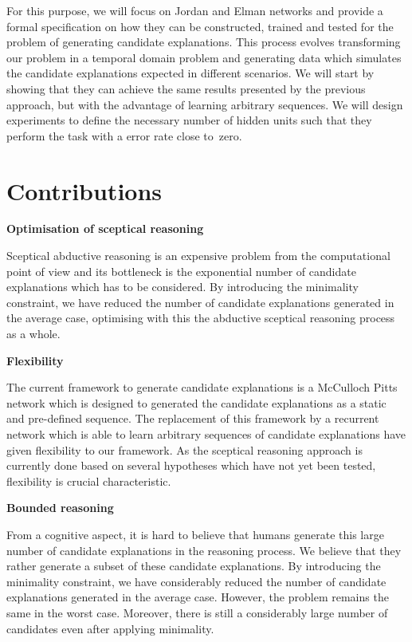 For this purpose, we will focus on Jordan and Elman networks and provide a formal specification on how they can be constructed, trained and tested for the problem of generating candidate explanations. This process evolves transforming our problem in a temporal domain problem and generating data which simulates the candidate explanations expected in different scenarios. We will start by showing that they can achieve the same results presented by the previous approach, but with the advantage of learning arbitrary sequences. We will design experiments to define the necessary number of hidden units such that they perform the task with a error rate close to~zero.

\section{Contributions}

\textbf{Optimisation of sceptical reasoning}

Sceptical abductive reasoning is an expensive problem from the computational point of view and its bottleneck is the exponential number of candidate explanations which has to be considered. By introducing the minimality constraint, we have reduced the number of candidate explanations generated in the average case, optimising with this the abductive sceptical reasoning process as a whole.

\textbf{Flexibility}

The current framework to generate candidate explanations is a McCulloch Pitts network which is designed to generated the candidate explanations as a static and pre-defined sequence. The replacement of this framework by a recurrent network which is able to learn arbitrary sequences of candidate explanations have given flexibility to our framework. As the sceptical reasoning approach is currently done based on several hypotheses which have not yet been tested, flexibility is crucial characteristic. 

\textbf{Bounded reasoning}

From a cognitive aspect, it is hard to believe that humans generate this large number of candidate explanations in the reasoning process. We believe that they rather generate a subset of these candidate explanations. By introducing the minimality constraint, we have considerably reduced the number of candidate explanations generated in the average case. However, the problem remains the same in the worst case. Moreover, there is still a considerably large number of candidates even after applying minimality. 

